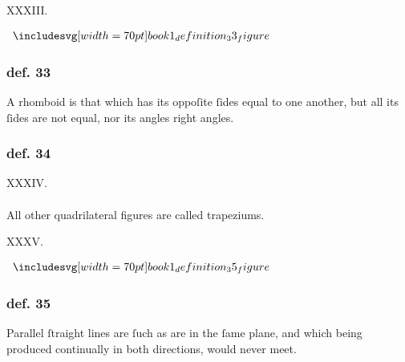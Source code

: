 \hfill

\begin{center}
    XXXIII.\label{book1def33}\\
\end{center}
\begin{minipage}{0.33\textwidth}
    \begin{center}
        $\img[0][0][70]{book1_definition_33_figure}$
    \end{center}
\end{minipage}%
\begin{minipage}{0.67\textwidth}
    \subsubsection{def. 33}
    \begin{center}
        \raggedright A rhomboid is that which has its oppoſite ſides equal to one another, but all its ſides are not equal, nor its angles right angles.
    \end{center}
\end{minipage}

\hfill

\begin{minipage}{0.1\textwidth}
    \phantom{}
\end{minipage}%
\begin{minipage}{0.8\textwidth}
    \subsubsection{def. 34}
    \begin{center}
        XXXIV.\label{book1def34}\\
        \hfill\\
        All other quadrilateral figures are called trapeziums.\\
    \end{center}
\end{minipage}%
\begin{minipage}{0.1\textwidth}
    \phantom{}
\end{minipage}%

\hfill

\begin{center}
    XXXV.\label{book1def35}\\
\end{center}
\begin{minipage}{0.33\textwidth}
    \begin{center}
        $\img[0][0][70]{book1_definition_35_figure}$
    \end{center}
\end{minipage}%
\begin{minipage}{0.67\textwidth}
    \subsubsection{def. 35}
    \begin{center}
        \raggedright Parallel ſtraight lines are ſuch as are in the ſame plane, and which being produced continually in both directions, would never meet.
    \end{center}
\end{minipage}

